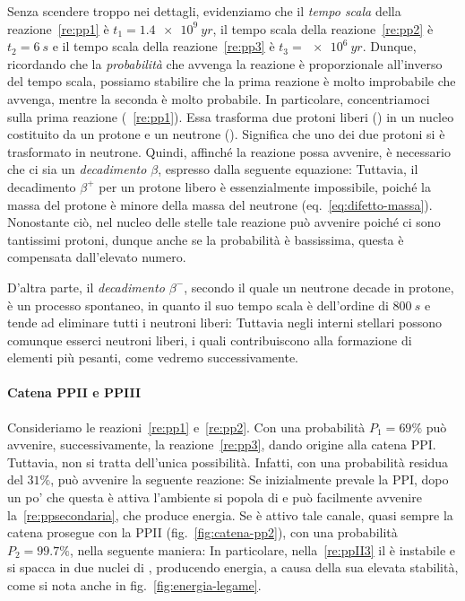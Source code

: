 Senza scendere troppo nei dettagli, evidenziamo che il \emph{tempo scala} della reazione~\ref{re:pp1} è $t_1 = \SI{1.4e9}{yr}$, il tempo scala della reazione~\ref{re:pp2} è $t_2 = \SI{6}{s}$ e il tempo scala della reazione~\ref{re:pp3} è $t_3 = \SI{e6}{yr}$. Dunque, ricordando che la \emph{probabilità} che avvenga la reazione è proporzionale all'inverso del tempo scala, possiamo stabilire che la prima reazione è molto improbabile che avvenga, mentre la seconda è molto probabile. In particolare, concentriamoci sulla prima reazione (~\ref{re:pp1}). Essa trasforma due protoni liberi () in un nucleo costituito da un protone e un neutrone (). Significa che uno dei due protoni si è trasformato in neutrone. Quindi, affinché la reazione possa avvenire, è necessario che ci sia un \emph{decadimento $\beta$}, espresso dalla seguente equazione:
Tuttavia, il decadimento $\beta^+$ per un protone libero è essenzialmente impossibile, poiché la massa del protone è minore della massa del neutrone (eq.~\eqref{eq:difetto-massa}). Nonostante ciò, nel nucleo delle stelle tale reazione può avvenire poiché ci sono tantissimi protoni, dunque anche se la probabilità è bassissima, questa è compensata dall'elevato numero. 

D'altra parte, il \emph{decadimento $\beta^-$}, secondo il quale un neutrone decade in protone, è un processo spontaneo, in quanto il suo tempo scala è dell'ordine di $\SI{800}{s}$ e tende ad eliminare tutti i neutroni liberi:
Tuttavia negli interni stellari possono comunque esserci neutroni liberi, i quali contribuiscono alla formazione di elementi più pesanti, come vedremo successivamente.

\paragraph{Catena PPII e PPIII}
Consideriamo le reazioni~\ref{re:pp1} e~\ref{re:pp2}. Con una probabilità $P_1 = 69 \%$ può avvenire, successivamente, la reazione~\ref{re:pp3}, dando origine alla catena PPI. Tuttavia, non si tratta dell'unica possibilità. Infatti, con una probabilità residua del $31\%$, può avvenire la seguente reazione:
Se inizialmente prevale la PPI, dopo un po' che questa è attiva l'ambiente si popola di  e può facilmente avvenire la~\ref{re:ppsecondaria}, che produce energia. Se è attivo tale canale, quasi sempre la catena prosegue con la PPII (fig.~\ref{fig:catena-pp2}), con una probabilità $P_2=99.7\%$, nella seguente maniera:
In particolare, nella~\ref{re:ppII3} il  è instabile e si spacca in due nuclei di , producendo energia, a causa della sua elevata stabilità, come si nota anche in fig.~\ref{fig:energia-legame}.

